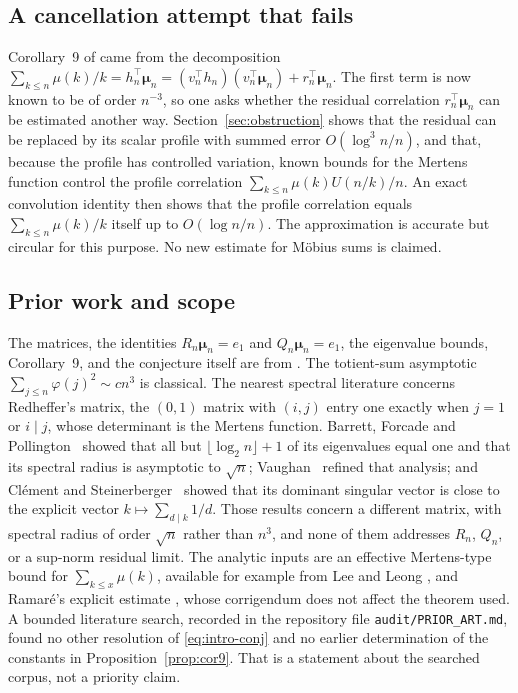 \documentclass[11pt]{article}
\theoremstyle{remark}\newtheorem{remark}[theorem]{Remark}
\newcommand{\muvec}{\boldsymbol\mu}
\begin{document}
\subsection*{A cancellation attempt that fails}
Corollary~9 of \cite{kline} came from the decomposition $\sum_{k\le n}\mu(k)/k=h_n^\top\muvec_n=(v_n^\top h_n)(v_n^\top\muvec_n)+r_n^\top\muvec_n$. The first term is now known to be of order $n^{-3}$, so one asks whether the residual correlation $r_n^\top\muvec_n$ can be estimated another way. Section~\ref{sec:obstruction} shows that the residual can be replaced by its scalar profile with summed error $O(\log^3n/n)$, and that, because the profile has controlled variation, known bounds for the Mertens function control the profile correlation $\sum_{k\le n}\mu(k)U(n/k)/n$. An exact convolution identity then shows that the profile correlation equals $\sum_{k\le n}\mu(k)/k$ itself up to $O(\log n/n)$. The approximation is accurate but circular for this purpose. No new estimate for M\"obius sums is claimed.

\subsection*{Prior work and scope}
The matrices, the identities $R_n\muvec_n=e_1$ and $Q_n\muvec_n=e_1$, the eigenvalue bounds, Corollary~9, and the conjecture itself are from \cite{kline}. The totient-sum asymptotic $\sum_{j\le n}\varphi(j)^2\sim cn^3$ is classical. The nearest spectral literature concerns Redheffer's matrix, the $(0,1)$ matrix with $(i,j)$ entry one exactly when $j=1$ or $i\mid j$, whose determinant is the Mertens function. Barrett, Forcade and Pollington~\cite{bfp} showed that all but $\lfloor\log_2n\rfloor+1$ of its eigenvalues equal one and that its spectral radius is asymptotic to $\sqrt n$; Vaughan~\cite{vaughan} refined that analysis; and Cl\'ement and Steinerberger~\cite{cs} showed that its dominant singular vector is close to the explicit vector $k\mapsto\sum_{d\mid k}1/d$. Those results concern a different matrix, with spectral radius of order $\sqrt n$ rather than $n^3$, and none of them addresses $R_n$, $Q_n$, or a sup-norm residual limit. The analytic inputs are an effective Mertens-type bound for $\sum_{k\le x}\mu(k)$, available for example from Lee and Leong \cite{lee}, and Ramar\'e's explicit estimate \cite{ramare}, whose corrigendum \cite{corr} does not affect the theorem used. A bounded literature search, recorded in the repository file \texttt{audit/PRIOR\_ART.md}, found no other resolution of \eqref{eq:intro-conj} and no earlier determination of the constants in Proposition~\ref{prop:cor9}. That is a statement about the searched corpus, not a priority claim.
\end{document}
